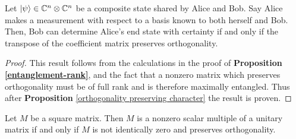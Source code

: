 \begin{prop} \label{prop: ultimate}
Let $\ket{\psi} \in \mathbb{C}^n \otimes \mathbb{C}^{n}$ be a composite state shared by Alice and Bob. Say Alice makes a measurement with respect to a basis known to both herself and Bob.  Then, Bob can determine Alice's end state with certainty if and only if the transpose of the coefficient matrix preserves orthogonality.
\end{prop}

\begin{proof}
This result follows from the calculations in the proof of \textbf{Proposition \ref{entanglement-rank}}, and the fact that a nonzero matrix which preserves orthogonality must be of full rank and is therefore maximally entangled.  Thus after {\bf{Proposition}} \ref{orthogonality preserving character} the result is proven.
\end{proof}




\begin{prop} \label{orthogonality preserving character}
Let $M$ be a square matrix.  Then $M$ is a nonzero scalar multiple of a unitary matrix if and only if $M$ is not identically zero and preserves orthogonality.

\end{prop}



